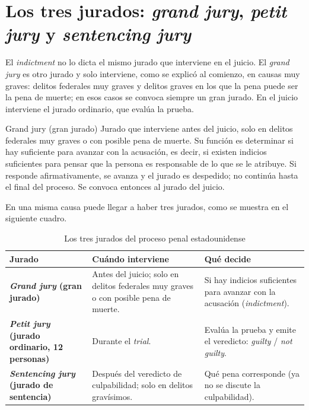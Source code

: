 \documentclass[12pt,oneside]{book}
\begin{document}
\section{Los tres jurados: \textit{grand jury}, \textit{petit jury} y \textit{sentencing jury}}

El \textit{indictment} no lo dicta el mismo jurado que interviene en el juicio. El \textit{grand jury} es otro jurado y solo interviene, como se explicó al comienzo, en causas muy graves: delitos federales muy graves y delitos graves en los que la pena puede ser la pena de muerte; en esos casos se convoca siempre un gran jurado. En el juicio interviene el jurado ordinario, que evalúa la prueba.

\begin{definition}{Grand jury (gran jurado)}
Jurado que interviene antes del juicio, solo en delitos federales muy graves o con posible pena de muerte. Su función es determinar si hay suficiente para avanzar con la acusación, es decir, si existen indicios suficientes para pensar que la persona es responsable de lo que se le atribuye. Si responde afirmativamente, se avanza y el jurado es despedido; no continúa hasta el final del proceso. Se convoca entonces al jurado del juicio.
\end{definition}

En una misma causa puede llegar a haber tres jurados, como se muestra en el siguiente cuadro.

\begin{table}[H]
\centering
\small
\caption{Los tres jurados del proceso penal estadounidense}
\begin{tabularx}{\textwidth}{L L L}
\toprule
\textbf{Jurado} & \textbf{Cuándo interviene} & \textbf{Qué decide} \\
\midrule
\textbf{\textit{Grand jury} (gran jurado)} & Antes del juicio; solo en delitos federales muy graves o con posible pena de muerte. & Si hay indicios suficientes para avanzar con la acusación (\textit{indictment}). \\
\addlinespace
\textbf{\textit{Petit jury} (jurado ordinario, 12 personas)} & Durante el \textit{trial}. & Evalúa la prueba y emite el veredicto: \textit{guilty} / \textit{not guilty}. \\
\addlinespace
\textbf{\textit{Sentencing jury} (jurado de sentencia)} & Después del veredicto de culpabilidad; solo en delitos gravísimos. & Qué pena corresponde (ya no se discute la culpabilidad). \\
\bottomrule
\end{tabularx}
\end{table}
\end{document}
